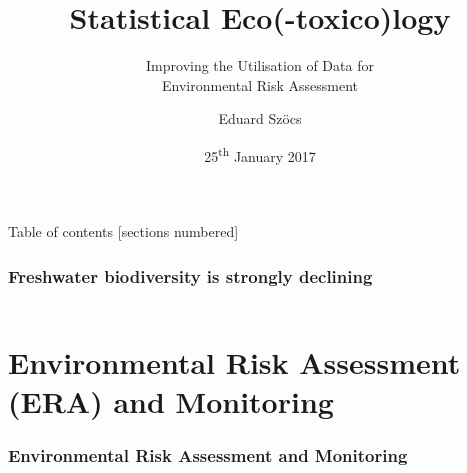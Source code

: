 \documentclass[
	12pt
	]{beamer}
\title{Statistical Eco(-toxico)logy}
\subtitle{Improving the Utilisation of Data for\\Environmental Risk Assessment}
\date{25\textsuperscript{th} January 2017}
\author{Eduard Sz\"{o}cs}
\begin{document}
\maketitle

\begin{frame}{Table of contents}
  [sections numbered]
  \tableofcontents[hideallsubsections]
\end{frame}


{%
\begin{frame}[t]
\frametitle{Freshwater biodiversity is strongly declining}
	\begin{columns}[T]
	\end{columns}
\end{frame}
}




\section[Environmental Risk Assessment and Environmental Monitoring
]{Environmental Risk Assessment (ERA) and Monitoring}

\begingroup
\footnotesize %
\begin{frame}
\frametitle{Environmental Risk Assessment and Monitoring}
    \vspace*{5mm}
	\resizebox{1.1\textwidth}{!}{
		\hspace*{-20mm}
	}
\end{frame}
\end{document}
